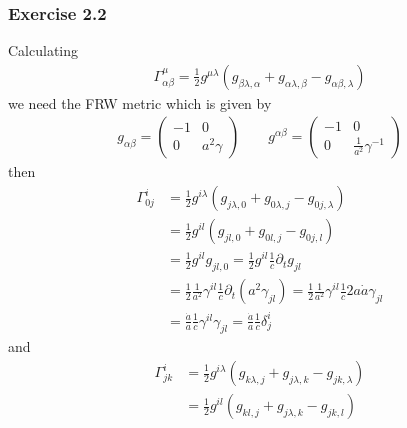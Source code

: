 \documentclass[10pt,a4paper]{article}
\theoremstyle{definition}
\begin{document}
\subsubsection{Exercise 2.2}
Calculating
\begin{align}
\Gamma^\mu_{\alpha\beta}=\frac{1}{2}g^{\mu\lambda}(g_{\beta\lambda,\alpha}+g_{\alpha\lambda,\beta}-g_{\alpha\beta,\lambda})
\end{align}
we need the FRW metric which is given by
\begin{align}
g_{\alpha\beta}=\left(\begin{array}{cc}
-1&0\\
0&a^2\gamma
\end{array}
\right)\qquad
g^{\alpha\beta}=\left(\begin{array}{cc}
-1&0\\
0&\frac{1}{a^2}\gamma^{-1}
\end{array}
\right)
\end{align}
then
\begin{align}
\Gamma^i_{0j}
&=\frac{1}{2}g^{i\lambda}(g_{j\lambda,0}+g_{0\lambda,j}-g_{0j,\lambda})\\
&=\frac{1}{2}g^{il}(g_{jl,0}+g_{0l,j}-g_{0j,l})\\
&=\frac{1}{2}g^{il}g_{jl,0}=\frac{1}{2}g^{il}\frac{1}{c}\partial_tg_{jl}\\
&=\frac{1}{2}\frac{1}{a^2}\gamma^{il}\frac{1}{c}\partial_t(a^2\gamma_{jl})=\frac{1}{2}\frac{1}{a^2}\gamma^{il}\frac{1}{c}2a\dot a\gamma_{jl}\\
&=\frac{\dot a}{a}\frac{1}{c}\gamma^{il}\gamma_{jl}=\frac{\dot a}{a}\frac{1}{c}\delta^i_j
\end{align}
and
\begin{align}
\Gamma^i_{jk}
&=\frac{1}{2}g^{i\lambda}(g_{k\lambda,j}+g_{j\lambda,k}-g_{jk,\lambda})\\
&=\frac{1}{2}g^{il}(g_{kl,j}+g_{j\lambda,k}-g_{jk,l})
\end{align}
\end{document}

